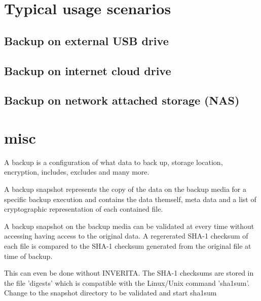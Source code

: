 \section{Typical usage scenarios}

\subsection{Backup on external USB drive}

\subsection{Backup on internet cloud drive}

\subsection{Backup on network attached storage (NAS)}


\section{misc}

A backup is a configuration of what data to back up, storage location,
encryption, includes, excludes and many more.

A backup snapshot represents the copy of the data on the backup media
for a specific backup execution and contains the data themself, meta data
and a list of cryptographic representation of each contained file.

A backup snapshot on the backup media can be validated at every time
without accessing having access to the original data. A regererated SHA-1
checksum of each file is compared to the SHA-1 checksum generated from the
original file at time of backup.

This can even be done without INVERITA. The SHA-1 checksums are stored
in the file 'digests' which is compatible with the Linux/Unix command 'sha1sum'.
Change to the snapshot directory to be validated and start sha1sum

